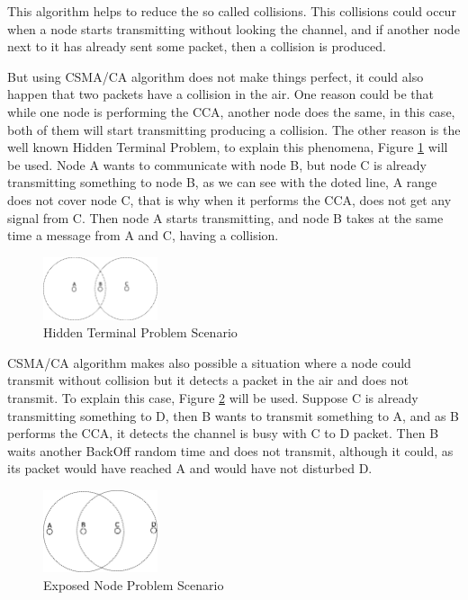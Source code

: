 This algorithm helps to reduce the so called collisions. This collisions could occur when a node starts transmitting without looking the 
channel, and if another node next to it has already sent some packet, then a collision is produced.

But using \ac{CSMA/CA} algorithm does not make things perfect, it could also happen that two packets have a collision in the air. One 
reason could be that while one node is performing the \ac{CCA}, another node does the same, in this case, both of them will start transmitting 
producing a collision. The other reason is the well known Hidden Terminal Problem, to explain this phenomena, Figure \ref{fig:HiddenTerminalProblem}
will be used. Node A wants to communicate with node B, but node C is already transmitting something to node B, as we can see with the doted line,
A range does not cover node C, that is why when it performs the \ac{CCA}, does not get any signal from C. Then node A starts transmitting, and 
node B takes at the same time a message from A and C, having a collision.

\begin{figure}[!ht]
 \begin{center}
  \includegraphics[width=0.3\textwidth]{HiddenTerminalProblem.eps}
 \end{center}
 \caption{Hidden Terminal Problem Scenario}
 \label{fig:HiddenTerminalProblem}
\end{figure}

\ac{CSMA/CA} algorithm makes also possible a situation where a node could transmit without collision but it detects a packet in the air and does
not transmit. To explain this case, Figure \ref{fig:ExposedNodeProblem} will be used. Suppose C is already transmitting something to D, 
then B wants to transmit something to A, and as B performs the \ac{CCA}, it detects the channel is busy with C to D packet. Then B waits another
BackOff random time and does not transmit, although it could, as its packet would have reached A and would have not disturbed D.

\begin{figure}[!ht]
 \begin{center}
  \includegraphics[width=0.3\textwidth]{ExposedNodeProblem.eps}
 \end{center}
 \caption{Exposed Node Problem Scenario}
 \label{fig:ExposedNodeProblem}
\end{figure}

